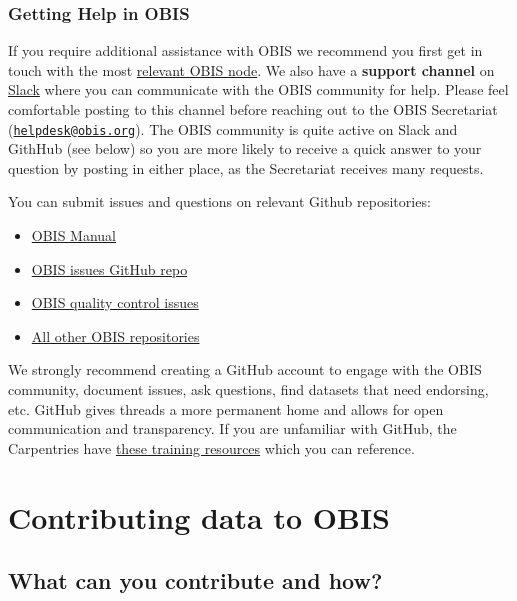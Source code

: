\documentclass[
  letterpaper,
  DIV=11,
  numbers=noendperiod,
  oneside]{scrreprt}
\providecommand{\tightlist}{%
  \setlength{\itemsep}{0pt}\setlength{\parskip}{0pt}}\usepackage{longtable,booktabs,array}
\begin{document}
\hypertarget{getting-help-in-obis}{%
\section{Getting Help in OBIS}\label{getting-help-in-obis}}

If you require additional assistance with OBIS we recommend you first
get in touch with the most \href{https://obis.org/contact/}{relevant
OBIS node}. We also have a \textbf{support channel} on
\href{https://obishq.slack.com/archives/C014PTTKECW}{Slack} where you
can communicate with the OBIS community for help. Please feel
comfortable posting to this channel before reaching out to the OBIS
Secretariat
(\href{mailto:helpdesk@obis.org}{\nolinkurl{helpdesk@obis.org}}). The
OBIS community is quite active on Slack and GithHub (see below) so you
are more likely to receive a quick answer to your question by posting in
either place, as the Secretariat receives many requests.

You can submit issues and questions on relevant Github repositories:

\begin{itemize}
\tightlist
\item
  \href{https://github.com/iobis/manual/issues}{OBIS Manual}
\item
  \href{https://github.com/iobis/obis-issues}{OBIS issues GitHub repo}
\item
  \href{https://github.com/iobis/obis-qc}{OBIS quality control issues}
\item
  \href{https://github.com/iobis}{All other OBIS repositories}
\end{itemize}

We strongly recommend creating a GitHub account to engage with the OBIS
community, document issues, ask questions, find datasets that need
endorsing, etc. GitHub gives threads a more permanent home and allows
for open communication and transparency. If you are unfamiliar with
GitHub, the Carpentries have
\href{https://swcarpentry.github.io/git-novice/index.html}{these
training resources} which you can reference.

\part{Contributing data to OBIS}

\hypertarget{what-can-you-contribute-and-how}{%
\chapter{What can you contribute and
how?}\label{what-can-you-contribute-and-how}}
\end{document}
